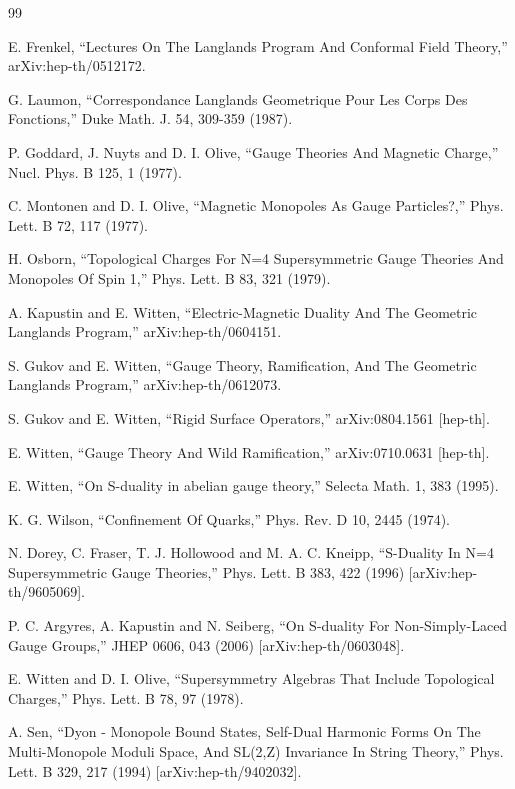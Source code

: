 \documentclass[11pt,a4paper,UTF8]{ctexart}
\begin{document}
\begin{thebibliography}{99}

E. Frenkel, ``Lectures On The Langlands Program And Conformal Field Theory,'' arXiv:hep-th/0512172.

G. Laumon, ``Correspondance Langlands Geometrique Pour Les Corps Des Fonctions,'' Duke Math. J. 54, 309-359 (1987).

P. Goddard, J. Nuyts and D. I. Olive, ``Gauge Theories And Magnetic Charge,'' Nucl. Phys. B 125, 1 (1977).

C. Montonen and D. I. Olive, ``Magnetic Monopoles As Gauge Particles?,'' Phys. Lett. B 72, 117 (1977).

H. Osborn, ``Topological Charges For N=4 Supersymmetric Gauge Theories And Monopoles Of Spin 1,'' Phys. Lett. B 83, 321 (1979).

A. Kapustin and E. Witten, ``Electric-Magnetic Duality And The Geometric Langlands Program,'' arXiv:hep-th/0604151.

S. Gukov and E. Witten, ``Gauge Theory, Ramification, And The Geometric Langlands Program,'' arXiv:hep-th/0612073.

S. Gukov and E. Witten, ``Rigid Surface Operators,'' arXiv:0804.1561 [hep-th].

E. Witten, ``Gauge Theory And Wild Ramification,'' arXiv:0710.0631 [hep-th].

E. Witten, ``On S-duality in abelian gauge theory,'' Selecta Math. 1, 383 (1995).

K. G. Wilson, ``Confinement Of Quarks,'' Phys. Rev. D 10, 2445 (1974).

N. Dorey, C. Fraser, T. J. Hollowood and M. A. C. Kneipp, ``S-Duality In N=4 Supersymmetric Gauge Theories,'' Phys. Lett. B 383, 422 (1996) [arXiv:hep-th/9605069].

P. C. Argyres, A. Kapustin and N. Seiberg, ``On S-duality For Non-Simply-Laced Gauge Groups,'' JHEP 0606, 043 (2006) [arXiv:hep-th/0603048].

E. Witten and D. I. Olive, ``Supersymmetry Algebras That Include Topological Charges,'' Phys. Lett. B 78, 97 (1978).

A. Sen, ``Dyon - Monopole Bound States, Self-Dual Harmonic Forms On The Multi-Monopole Moduli Space, And SL(2,Z) Invariance In String Theory,'' Phys. Lett. B 329, 217 (1994) [arXiv:hep-th/9402032].


\end{thebibliography}
\end{document}
